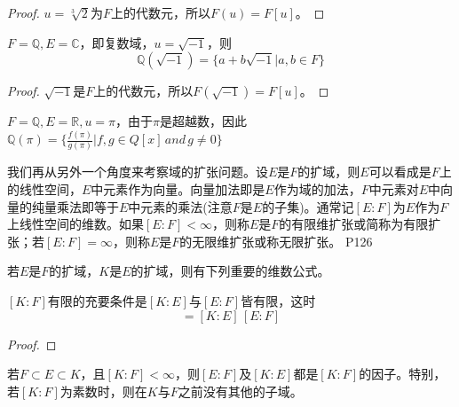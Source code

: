 \begin{proof}
	$u=\sqrt[3]{2}$为$F$上的代数元，所以$F(u)=F[u]$。
\end{proof}

\begin{example}
	$F=\mathbb{Q},E=\mathbb{C}$，即复数域，$u=\sqrt{-1}$，则
	\begin{equation*}
		\mathbb{Q}(\sqrt{-1})=\{a+b\sqrt{-1}\big| a,b\in F\}
	\end{equation*}
\end{example}

\begin{proof}
	$\sqrt{-1}$是$F$上的代数元，所以$F(\sqrt{-1})=F[u]$。
\end{proof}

\begin{example}
	$F=\mathbb{Q},E=\mathbb{R},u=\pi$，由于$\pi$是超越数，因此$\mathbb{Q}(\pi)=\{\frac{f(\pi)}{g(\pi)}\big| f,g\in Q[x]\,and\,g\neq 0\}$
\end{example}

\original
{
	我们再从另外一个角度来考察域的扩张问题。设$E$是$F$的扩域，则$E$可以看成是$F$上的线性空间，$E$中元素作为向量。向量加法即是$E$作为域的加法，$F$中元素对$E$中向量的纯量乘法即等于$E$中元素的乘法(注意$F$是$E$的子集)。通常记$[E:F]$为$E$作为$F$上线性空间的维数。如果$[E:F]<\infty$，则称$E$是$F$的有限维扩张或简称为有限扩张；若$[E:F]=\infty$，则称$E$是$F$的无限维扩张或称无限扩张。
}
{P126}
\par 若$E$是$F$的扩域，$K$是$E$的扩域，则有下列重要的维数公式。
\begin{theorem}\label{YMSthe040101}
	$[K:F]$有限的充要条件是$[K:E]$与$[E:F]$皆有限，这时
	\begin{equation*}
		[K:F]=[K:E]\,[E:F]
	\end{equation*}
\end{theorem}

\begin{proof}
	
\end{proof}


\begin{corollary}
	若$F\subset E\subset K$，且$[K:F]<\infty$，则$[E:F]$及$[K:E]$都是$[K:F]$的因子。特别，若$[K:F]$为素数时，则在$K$与$F$之前没有其他的子域。
\end{corollary}

